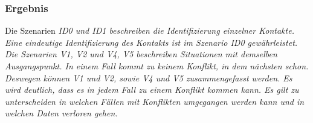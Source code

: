 \subsubsection*{Ergebnis}
Die Szenarien \it{ID0} und \it{ID1} beschreiben die Identifizierung einzelner Kontakte. Eine eindeutige Identifizierung des Kontakts ist im Szenario \it{ID0} gewährleistet.\\
Die Szenarien \it{V1}, \it{V2} und \it{V4}, \it{V5} beschreiben Situationen mit demselben Ausgangspunkt. In einem Fall kommt zu keinem Konflikt, in dem nächsten schon. Deswegen können \it{V1} und \it{V2}, sowie \it{V4} und \it{V5} zusammengefasst werden. Es wird deutlich, dass es in jedem Fall zu einem Konflikt kommen kann. Es gilt zu unterscheiden in welchen Fällen mit Konflikten umgegangen werden kann und in welchen Daten verloren gehen.\\
\\\\
